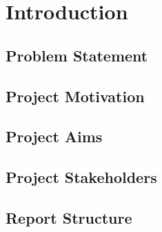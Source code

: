 \chapter{Introduction}
\label{Chapter:Introduction}

\section{Problem Statement}

\section{Project Motivation}

\section{Project Aims}

\section{Project Stakeholders}

\section{Report Structure}